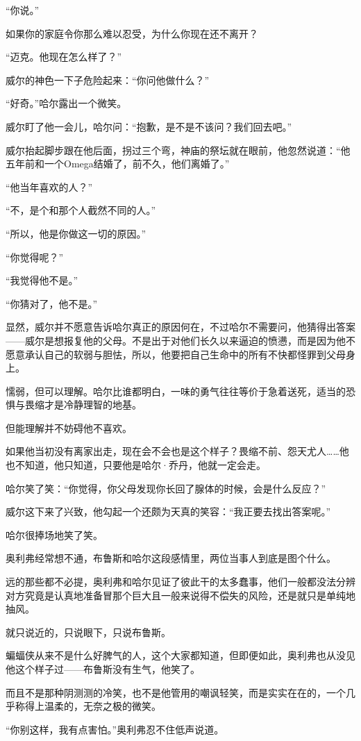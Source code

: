 \documentclass[../main]{subfiles}
\begin{document}
“你说。”

如果你的家庭令你那么难以忍受，为什么你现在还不离开？

“迈克。他现在怎么样了？”

威尔的神色一下子危险起来：“你问他做什么？”

“好奇。”哈尔露出一个微笑。

威尔盯了他一会儿，哈尔问：“抱歉，是不是不该问？我们回去吧。”

威尔抬起脚步跟在他后面，拐过三个弯，神庙的祭坛就在眼前，他忽然说道：“他五年前和一个Omega结婚了，前不久，他们离婚了。”

“他当年喜欢的人？”

“不，是个和那个人截然不同的人。”

“所以，他是你做这一切的原因。”

“你觉得呢？”

“我觉得他不是。”

“你猜对了，他不是。”

显然，威尔并不愿意告诉哈尔真正的原因何在，不过哈尔不需要问，他猜得出答案——威尔是想报复他的父母。不是出于对他们长久以来逼迫的愤懑，而是因为他不愿意承认自己的软弱与胆怯，所以，他要把自己生命中的所有不快都怪罪到父母身上。

懦弱，但可以理解。哈尔比谁都明白，一味的勇气往往等价于急着送死，适当的恐惧与畏缩才是冷静理智的地基。

但能理解并不妨碍他不喜欢。

如果他当初没有离家出走，现在会不会也是这个样子？畏缩不前、怨天尤人……他也不知道，他只知道，只要他是哈尔·乔丹，他就一定会走。

哈尔笑了笑：“你觉得，你父母发现你长回了腺体的时候，会是什么反应？”

威尔这下来了兴致，他勾起一个还颇为天真的笑容：“我正要去找出答案呢。”

哈尔很捧场地笑了笑。

奥利弗经常想不通，布鲁斯和哈尔这段感情里，两位当事人到底是图个什么。

远的那些都不必提，奥利弗和哈尔见证了彼此干的太多蠢事，他们一般都没法分辨对方究竟是认真地准备冒那个巨大且一般来说得不偿失的风险，还是就只是单纯地抽风。

就只说近的，只说眼下，只说布鲁斯。

蝙蝠侠从来不是什么好脾气的人，这个大家都知道，但即便如此，奥利弗也从没见他这个样子过——布鲁斯没有生气，他笑了。

而且不是那种阴测测的冷笑，也不是他管用的嘲讽轻笑，而是实实在在的，一个几乎称得上温柔的，无奈之极的微笑。

“你别这样，我有点害怕。”奥利弗忍不住低声说道。
\end{document}
